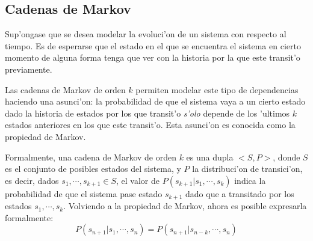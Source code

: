 %
%
%
%
%

\subsection{Cadenas de Markov}
Sup'ongase que se desea modelar la evoluci'on de un sistema con respecto al tiempo. Es de esperarse que 
el estado en el que se encuentra el sistema en cierto momento de alguna forma tenga que ver con la historia por la que este transit'o
previamente. 

Las cadenas de Markov de orden $k$ permiten modelar este tipo de dependencias haciendo una asunci'on: la probabilidad de que el sistema vaya a un cierto estado
dado la historia de estados por los que transit'o \emph{s'olo} depende de los 'ultimos $k$ estados anteriores en los que este transit'o. 
Esta asunci'on es conocida como la propiedad de Markov. 

Formalmente, una cadena de Markov de orden $k$ es una dupla $<S,P>$, donde $S$ es el conjunto de posibles estados del sistema, y $P$ la 
distribuci'on de transici'on, es decir, dados $s_1, \cdots, s_{k+1} \in S$, el valor de $P(s_{k+1} | s_1, \cdots, s_k)$ indica la probabilidad
de que el sistema pase estado $s_{k+1}$ dado que a transitado por los estados $s_1, \cdots, s_k$. 
Volviendo a la propiedad de Markov, ahora es posible expresarla formalmente: $$P(s_{n+1}|s_1,\cdots,s_n) = P(s_{n+1} | s_{n-k}, \cdots, s_n)$$


